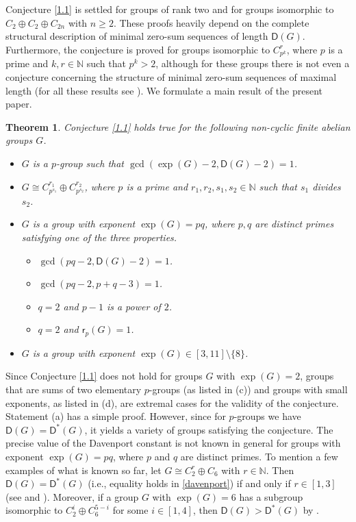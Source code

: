 \documentclass[a4paper,10pt]{amsart}
\theoremstyle{plain}
\newtheorem{theorem}{\bf Theorem}[section]
\theoremstyle{definition}
\newcommand{\N}{\mathbb N}
\numberwithin{equation}{section}
\begin{document}
\smallskip
Conjecture \ref{1.1} is settled for groups of rank two and for groups isomorphic to $C_2 \oplus C_2 \oplus C_{2n}$ with $n \ge 2$. These proofs heavily depend on the complete structural description of minimal zero-sum sequences of length $\mathsf D (G)$. Furthermore, the conjecture is proved for
groups isomorphic to $C_{p^k}^r$, where $p$ is a prime and $k, r \in \N$ such that $p^k > 2$, although for these groups there is not even a conjecture concerning the structure of minimal zero-sum sequences of maximal length (for all these results see \cite{Ge-Zh18a}). We formulate a main result of the present paper.

\begin{theorem} \label{1.2}
Conjecture \ref{1.1} holds true for the following non-cyclic finite abelian groups $G$.
\begin{itemize}
\item[(a)]  $G$ is a $p$-group such that $\gcd (\exp (G)-2, \mathsf D (G)-2)=1$.

\item[(b)]  $G\cong C_{p^{s_1}}^{r_1}\oplus C_{p^{s_2}}^{r_2}$, where $p$ is a prime and $r_1,r_2, s_1, s_2\in \N$ such that $s_1$ divides $s_2$.

\item[(c)] $G$ is a  group with exponent $\exp (G) = pq$, where $p, q$ are distinct primes satisfying one of the three properties.
           \begin{itemize}
           \item[(i)] $\gcd ( pq-2, \mathsf D (G)-2 ) = 1$.
           \item[(ii)] $\gcd(pq - 2, p+q-3)=1$.
           \item[(iii)] $q=2$ and $p-1$ is a power of $2$.
           \item[(iv)] $q=2$ and $\mathsf r_p (G) = 1$.
           \end{itemize}


\item[(d)]  $G$ is a  group with exponent $\exp (G) \in [3,11]\setminus \{8\}$.
\end{itemize}
\end{theorem}

Since Conjecture \ref{1.1} does not hold for groups $G$ with $\exp (G)=2$, groups that are sums of two elementary $p$-groups (as listed in (c)) and groups with small exponents, as listed in (d), are extremal cases for the validity of the conjecture. Statement (a) has a simple proof. However, since for $p$-groups we have $\mathsf D (G) = \mathsf D^* (G)$, it yields a variety of groups satisfying the conjecture. The precise value of the Davenport constant is not known in general for groups with exponent $\exp (G)=pq$, where $p$ and $q$ are distinct primes. To mention a few examples of what is known so far, let
 $G \cong C_2^r \oplus C_6$ with $r \in \N$. Then $\mathsf D (G) = \mathsf D^* (G)$ (i.e., equality holds in \eqref{davenport}) if and only if $r \in [1,3]$ (see \cite[Corollary 2]{Ge-Sc92} and \cite{Sa-Ch14a}). Moreover, if a group $G$ with $\exp (G)=6$ has a subgroup isomorphic to $C_2^i \oplus C_6^{5-i}$ for some $i \in [1,4]$, then $\mathsf D (G) > \mathsf D^* (G)$ by \cite[Theorem 3.1]{Ge-Li-Ph12}.
\end{document}
